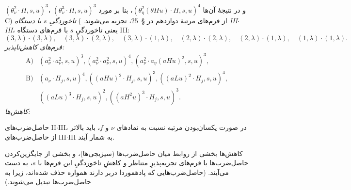 \documentclass[11pt]{article}
\begin{document}
$(\theta_\nu^2\cdot H,s,u)^3$، $(\theta_\nu^3\cdot H,s,u)^3$
و در نتیجهٔ آن‌ها $(\theta_\eta^2(\theta Hu)\cdot H,s,u)^4$، بنا بر مورد C) از فرم‌های مرتبهٔ دوازدهم در \S\ 25، تجزیه می‌شوند.
) \emph{تاخوردگیِ $s$ با دستگاه III$\cdot$III}، یعنی تاخوردگیِ $s$ با فرم‌های دستگاه III:
\[
(3,\lambda)\cdot(3,\lambda),\quad (3,\lambda)\cdot(2,\lambda),\quad (3,\lambda)\cdot(1,\lambda),\quad
(2,\lambda)\cdot(2,\lambda),\quad (2,\lambda)\cdot(1,\lambda),\quad
(1,\lambda)\cdot(1,\lambda).
\]
\noindent\emph{فرم‌های کاهش‌ناپذیر:}
\[
\begin{array}{rl}
\text{A)}&(a_\nu^2\cdot a_\nu^2,s,u)^3,
(a_\nu^2\cdot a_\nu^2,s,u)^4,
(a_\nu^2\cdot a_\eta(aHu)^2,s,u)^3,\\[0.45em]
\text{B)}&(a_\nu\cdot H_j,s,u)^4,
((aHu)^2\cdot H_j,s,u)^3,
((aLu)^2\cdot H_j,s,u)^4,\\[0.25em]
&((aLu)^3\cdot H_j,s,u)^2,
((aH^2u)^3\cdot H_j,s,u)^3.
\end{array}
\]
\noindent\emph{کاهش‌ها:}

حاصل‌ضرب‌های II$\cdot$III، در صورت یکسان‌بودن مرتبه نسبت به نمادهای $\nu$ و $f$، باید بالاتر از حاصل‌ضرب‌های III$\cdot$III به شمار آیند.

کاهش‌ها بخشی از روابط میان حاصل‌ضرب‌ها (سیزیجی‌ها)، و بخشی از جایگزین‌کردن حاصل‌ضرب‌ها با فرم‌های تجزیه‌پذیرِ متناظر و کاهشِ تاخوردگیِ این فرم‌ها با $s$، به دست می‌آیند. (حاصل‌ضرب‌هایی که پادهموردا دربر دارند همواره حذف شده‌اند، زیرا به حاصل‌ضرب‌ها تبدیل می‌شوند.)
\end{document}
